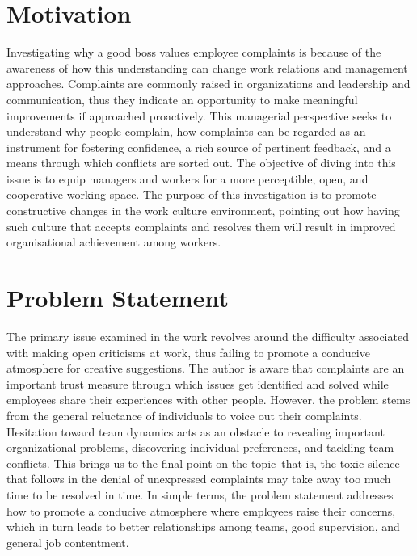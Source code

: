 \documentclass[a4paper,12pt]{report}
\begin{document}
\section{Motivation}
\begin{enumerate}
Investigating why a good boss values employee complaints is because of the awareness of how this understanding can change work relations and management approaches. Complaints are commonly raised in organizations and leadership and communication, thus they indicate an opportunity to make meaningful improvements if approached proactively. This managerial perspective seeks to understand why people complain, how complaints can be regarded as an instrument for fostering confidence, a rich source of pertinent feedback, and a means through which conflicts are sorted out. The objective of diving into this issue is to equip managers and workers for a more perceptible, open, and cooperative working space. The purpose of this investigation is to promote constructive changes in the work culture environment, pointing out how having such culture that accepts complaints and resolves them will result in improved organisational achievement among workers.    
\end{enumerate}


\section{Problem Statement}
\begin{enumerate}
The primary issue examined in the work revolves around the difficulty associated with making open criticisms at work, thus failing to promote a conducive atmosphere for creative suggestions. The author is aware that complaints are an important trust measure through which issues get identified and solved while employees share their experiences with other people. However, the problem stems from the general reluctance of individuals to voice out their complaints. Hesitation toward team dynamics acts as an obstacle to revealing important organizational problems, discovering individual preferences, and tackling team conflicts. This brings us to the final point on the topic–that is, the toxic silence that follows in the denial of unexpressed complaints may take away too much time to be resolved in time. In simple terms, the problem statement addresses how to promote a conducive atmosphere where employees raise their concerns, which in turn leads to better relationships among teams, good supervision, and general job contentment.
\end{enumerate}
\end{document}
